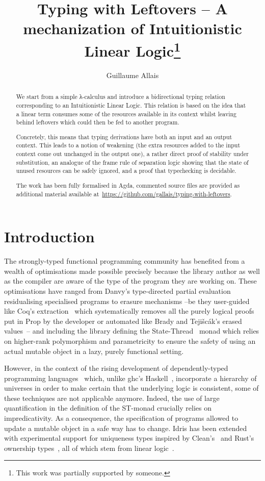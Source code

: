 \documentclass[a4paper,UKenglish]{lipics-v2016}
\title{Typing with Leftovers -- A mechanization of Intuitionistic Linear Logic\footnote{This work was partially supported by someone.}}
\author[1]{Guillaume Allais}
\affil[1]{Nijmegen Quantum Logic Group ─ Radboud University\\
  \texttt{gallais@cs.ru.nl}}
\begin{document}
\maketitle

\begin{abstract}
We start from a simple λ-calculus and introduce a bidirectional 
typing relation corresponding to an Intuitionistic Linear Logic. This 
relation is based on the idea that a linear term consumes some of the
resources available in its context whilst leaving behind leftovers
which could then be fed to another program. 

Concretely, this means that typing derivations have both an input 
and an output context. This leads to a notion of weakening (the extra
resources added to the input context come out unchanged in the output
one), a rather direct proof of stability under substitution, an
analogue of the frame rule of separation logic showing that the 
state of unused resources can be safely ignored, and a proof that
typechecking is decidable. 

The work has been fully formalised in Agda, commented source files 
are provided as additional material available at~\url{https://github.com/gallais/typing-with-leftovers}.
\end{abstract}

\section{Introduction}

The strongly-typed functional programming community has benefited from
a wealth of optimisations made possible precisely because the library
author as well as the compiler are aware of the type of the program they
are working on. These optimisations have ranged from Danvy's type-directed
partial evaluation~\cite{Danvy1999Type} residualising specialised programs
to erasure mechanisms --be they user-guided like Coq's extraction~\cite{letouzey2002new}
which systematically removes all the purely logical proofs put in Prop by
the developer or automated like Brady and Teji{\v{s}}c{\'a}k's erased
values~\cite{brady2003inductive,bradypractical}-- and including the library
defining the State-Thread~\cite{launchbury1994lazy} monad which relies on
higher-rank polymorphism and parametricity to ensure the safety of using an
actual mutable object in a lazy, purely functional setting.

However, in the context of the rising development of dependently-typed
programming languages~\cite{Brady2013idris, norell2009dependently} which,
unlike ghc's Haskell~\cite{weirich2013towards}, incorporate a hierarchy
of universes in order to make certain that the underlying logic is consistent,
some of these techniques are not applicable anymore. Indeed, the use of
large quantification in the definition of the ST-monad crucially relies
on impredicativity. As a consequence, the specification of programs
allowed to update a mutable object in a safe way has to change.
Idris has been extended with experimental support for uniqueness types
inspired by Clean's~\cite{achten1993high} and Rust's ownership types~\cite{manual:rust},
all of which stem from linear logic~\cite{girard1987linear}.
\end{document}
